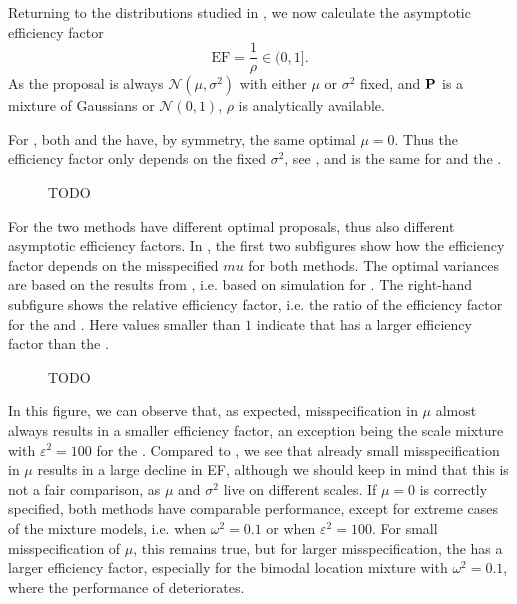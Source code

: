 Returning to the distributions studied in , we now calculate the asymptotic efficiency factor
$$
\text{EF} = \frac{1}{\rho} \in (0, 1].
$$
As the proposal is always $\mathcal N(\mu, \sigma^{2})$ with either $\mu$ or $\sigma^{2}$ fixed, and $\P$ is a mixture of Gaussians or $\mathcal N(0,1)$, $\rho$ is analytically available. 

For , both \aeis and the \acem have, by symmetry, the same optimal $\mu = 0$. Thus the efficiency factor only depends on the fixed $\sigma^{2}$, see , and is the same for \aeis and the \acem.

\begin{figure}
    \centering
    \resizebox{\textwidth}{!}{%
    }
    \caption{{\color{red}} TODO}
    \label{fig:rho_mu}

\end{figure}

For  the two methods have different optimal proposals, thus also different asymptotic efficiency factors. In , the first two subfigures show how the efficiency factor depends on the misspecified $mu$ for both methods. The optimal variances are based on the results from , i.e. based on simulation for \aeis. The right-hand subfigure shows the relative efficiency factor, i.e. the ratio of the efficiency factor for the \acem and \aeis. Here values smaller than $1$ indicate that \aeis has a larger efficiency factor than the \acem. 

\begin{figure}
    \centering

    \resizebox{\textwidth}{!}{%
    }
    \caption{{\color{red} TODO}}
    \label{fig:rho}
\end{figure} 

In this figure, we can observe that, as expected, misspecification in $\mu$ almost always results in a smaller efficiency factor, an exception being the scale mixture with $\varepsilon^{2} = 100$ for the \acem. 
Compared to , we see that already small misspecification in $\mu$ results in a large decline in EF, although we should keep in mind that this is not a fair comparison, as $\mu$ and $\sigma^{2}$ live on different scales.
If $\mu = 0 $ is correctly specified, both methods have comparable performance, except for extreme cases of the mixture models, i.e. when $\omega^{2} = 0.1$ or when $\varepsilon^{2} = 100$. 
For small misspecification of $\mu$, this remains true, but for larger misspecification, the \acem has a larger efficiency factor, especially for the bimodal location mixture with $\omega^{2} = 0.1$, where the performance of \aeis deteriorates. 

